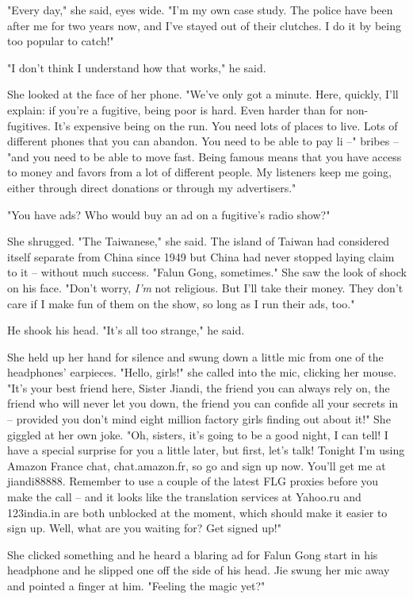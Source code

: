 "Every day," she said, eyes wide. "I'm my own case study. The
police have been after me for two years now, and I've stayed out of
their clutches. I do it by being too popular to catch!"

"I don't think I understand how that works," he said.

She looked at the face of her phone. "We've only got a minute.
Here, quickly, I'll explain: if you're a fugitive, being poor is
hard. Even harder than for non-fugitives. It's expensive being on
the run. You need lots of places to live. Lots of different phones
that you can abandon. You need to be able to pay li --" bribes --
"and you need to be able to move fast. Being famous means that you
have access to money and favors from a lot of different people. My
listeners keep me going, either through direct donations or through
my advertisers."

"You have ads? Who would buy an ad on a fugitive's radio show?"

She shrugged. "The Taiwanese," she said. The island of Taiwan had
considered itself separate from China since 1949 but China had
never stopped laying claim to it -- without much success. "Falun
Gong, sometimes." She saw the look of shock on his face. "Don't
worry, \emph{I'm} not religious. But I'll take their money. They
don't care if I make fun of them on the show, so long as I run
their ads, too."

He shook his head. "It's all too strange," he said.

She held up her hand for silence and swung down a little mic from
one of the headphones' earpieces. "Hello, girls!" she called into
the mic, clicking her mouse. "It's your best friend here, Sister
Jiandi, the friend you can always rely on, the friend who will
never let you down, the friend you can confide all your secrets in
-- provided you don't mind eight million factory girls finding out
about it!" She giggled at her own joke. "Oh, sisters, it's going to
be a good night, I can tell! I have a special surprise for you a
little later, but first, let's talk! Tonight I'm using Amazon
France chat, chat.amazon.fr, so go and sign up now. You'll get me
at jiandi88888. Remember to use a couple of the latest FLG proxies
before you make the call -- and it looks like the translation
services at Yahoo.ru and 123india.in are both unblocked at the
moment, which should make it easier to sign up. Well, what are you
waiting for? Get signed up!"

She clicked something and he heard a blaring ad for Falun Gong
start in his headphone and he slipped one off the side of his head.
Jie swung her mic away and pointed a finger at him. "Feeling the
magic yet?"

